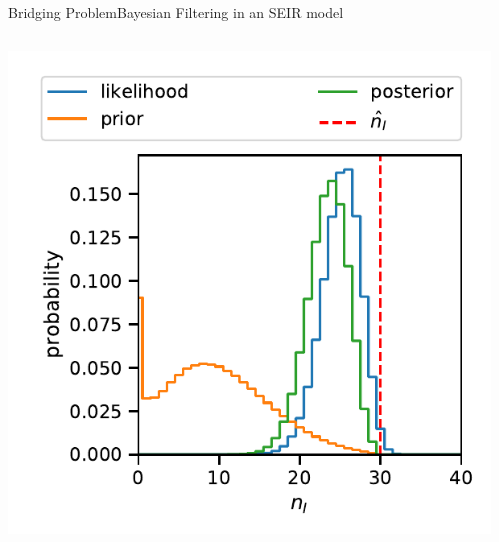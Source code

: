 \documentclass[10pt]{beamer}
\begin{document}
\begin{frame}{Bridging Problem}{Bayesian Filtering in an SEIR model}
\begin{columns}
\begin{column}{.35\paperwidth}
            \includegraphics[width=\textwidth]{../gfx/posterior.pdf}
        \end{column}
        \begin{column}{.25\paperwidth}

\end{column}
\end{columns}
\end{frame}
\end{document}
